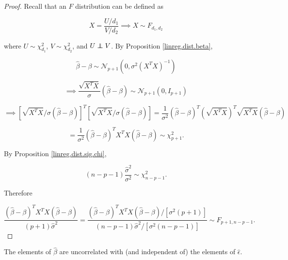 \begin{proof}

Recall that an \(F\) distribution can be defined as

\[
X = \frac{U/d_1}{V/d_2} \implies X \sim F_{d_1, d_2}
\]

where \(U \sim \chi_{d_1}^2\), \(V \sim \chi_{d_2}^2\), and \(U \indep V\). By Proposition \ref{linreg.dist.beta},

\[
\hat{\beta} - \beta  \sim  \mathcal{N}_{p+1} \left(0, \sigma^2  (X^TX)^{-1}  \right) 
\]

\[
\implies \frac{\sqrt{X^TX}}{\sigma} (\hat{\beta} - \beta)  \sim  \mathcal{N}_{p+1} \left(0, I_{p+1}  \right) 
\]

\[
\implies \left[ \sqrt{X^TX}/\sigma (\hat{\beta} - \beta)\right]^T \left[ \sqrt{X^TX} /\sigma(\hat{\beta} - \beta)\right] = \frac{1}{\sigma^2}   (\hat{\beta} - \beta)^T \left( \sqrt{X^TX} \right)^T \sqrt{X^TX}  (\hat{\beta} - \beta)   
\]

\[
=   \frac{1}{\sigma^2}( \hat{\beta} - \beta)^T X^TX( \hat{\beta} - \beta) \sim \chi_{p+1}^2.
\]

By Proposition \ref{linreg.dist.sig.chi}, 

\[
(n - p - 1) \frac{ \hat{\sigma}^2}{\sigma^2}  \sim \chi_{n - p - 1}^2.
\]

Therefore

\[
\frac{( \hat{\beta} - \beta)^T X^TX( \hat{\beta} - \beta) }{(p+1)\hat{\sigma}^2} = \frac{( \hat{\beta} - \beta)^T X^TX( \hat{\beta} - \beta)/[\sigma^2(p+1)]}{(n - p - 1) \hat{\sigma}^2 / [ \sigma^2 (n - p - 1)]} \sim F_{p+1, n-p-1}.
\]


\end{proof}

\begin{proposition}\label{linreg.beta.resids.uncorr}

The elements of \(\hat{\beta}\) are uncorrelated with (and independent of) the elements of \(\hat{\epsilon}\).

\end{proposition}

